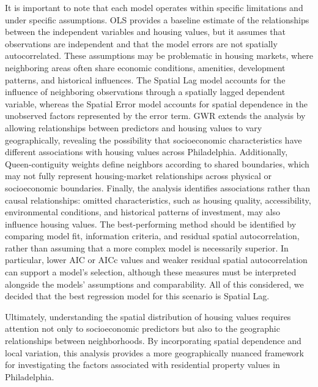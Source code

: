 \documentclass[
  12pt,
]{article}
\begin{document}
It is important to note that each model operates within specific
limitations and under specific assumptions. OLS provides a baseline
estimate of the relationships between the independent variables and
housing values, but it assumes that observations are independent and
that the model errors are not spatially autocorrelated. These
assumptions may be problematic in housing markets, where neighboring
areas often share economic conditions, amenities, development patterns,
and historical influences. The Spatial Lag model accounts for the
influence of neighboring observations through a spatially lagged
dependent variable, whereas the Spatial Error model accounts for spatial
dependence in the unobserved factors represented by the error term. GWR
extends the analysis by allowing relationships between predictors and
housing values to vary geographically, revealing the possibility that
socioeconomic characteristics have different associations with housing
values across Philadelphia. Additionally, Queen-contiguity weights
define neighbors according to shared boundaries, which may not fully
represent housing-market relationships across physical or socioeconomic
boundaries. Finally, the analysis identifies associations rather than
causal relationships: omitted characteristics, such as housing quality,
accessibility, environmental conditions, and historical patterns of
investment, may also influence housing values. The best-performing
method should be identified by comparing model fit, information
criteria, and residual spatial autocorrelation, rather than assuming
that a more complex model is necessarily superior. In particular, lower
AIC or AICc values and weaker residual spatial autocorrelation can
support a model's selection, although these measures must be interpreted
alongside the models' assumptions and comparability. All of this
considered, we decided that the best regression model for this scenario
is Spatial Lag.

Ultimately, understanding the spatial distribution of housing values
requires attention not only to socioeconomic predictors but also to the
geographic relationships between neighborhoods. By incorporating spatial
dependence and local variation, this analysis provides a more
geographically nuanced framework for investigating the factors
associated with residential property values in Philadelphia.
\end{document}

